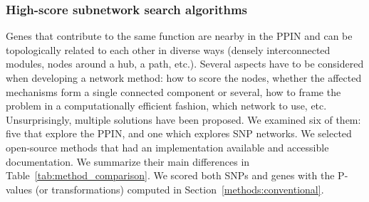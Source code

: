 \documentclass[10pt,letterpaper]{article}
\begin{document}
\subsubsection{High-score subnetwork search algorithms}
\label{methods:methods}

Genes that contribute to the same function are nearby in the PPIN and can be topologically related to each other in diverse ways (densely interconnected modules, nodes around a hub, a path, etc.). Several aspects have to be considered when developing a network method: how to score the nodes, whether the affected mechanisms form a single connected component or several, how to frame the problem in a computationally efficient fashion, which network to use, etc. Unsurprisingly, multiple solutions have been proposed. We examined six of them: five that explore the PPIN, and one which explores SNP networks. We selected open-source methods that had an implementation available and accessible documentation. We summarize their main differences in Table~\ref{tab:method_comparison}. We scored both SNPs and genes with the P-values (or transformations) computed in Section~\ref{methods:conventional}.
\end{document}
